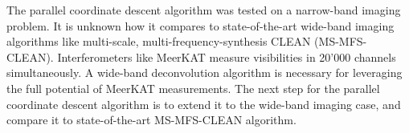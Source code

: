 The parallel coordinate descent algorithm was tested on a narrow-band imaging problem. It is unknown how it compares to state-of-the-art wide-band imaging algorithms like multi-scale, multi-frequency-synthesis CLEAN (MS-MFS-CLEAN). Interferometers like MeerKAT measure visibilities in 20'000 channels simultaneously. A wide-band deconvolution algorithm is necessary for leveraging the full potential of MeerKAT measurements. The next step for the parallel coordinate descent algorithm is to extend it to the wide-band imaging case, and compare it to state-of-the-art MS-MFS-CLEAN algorithm.
 







